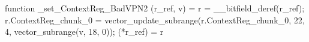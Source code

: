 function _set_ContextReg_BadVPN2 (r_ref, v) = {
    r = __bitfield_deref(r_ref);
    r.ContextReg_chunk_0 = vector_update_subrange(r.ContextReg_chunk_0, 22, 4, vector_subrange(v, 18, 0));
    (*r_ref) = r
}
